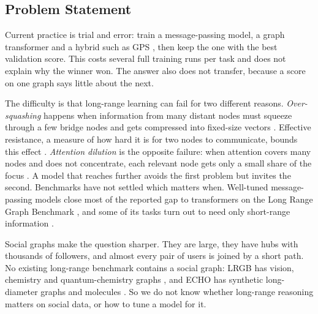 \subsection{Problem Statement}
Current practice is trial and error: train a message-passing model, a graph transformer and a hybrid such as GPS \citep{rampasek2022}, then keep the one with the best validation score. This costs several full training runs per task and does not explain why the winner won. The answer also does not transfer, because a score on one graph says little about the next.

The difficulty is that long-range learning can fail for two different reasons. \emph{Over-squashing} happens when information from many distant nodes must squeeze through a few bridge nodes and gets compressed into fixed-size vectors \citep{alon2021,topping2022}. Effective resistance, a measure of how hard it is for two nodes to communicate, bounds this effect \citep{digiovanni2023,black2023}. \emph{Attention dilution} is the opposite failure: when attention covers many nodes and does not concentrate, each relevant node gets only a small share of the focus \citep{xing2024}. A model that reaches further avoids the first problem but invites the second. Benchmarks have not settled which matters when. Well-tuned message-passing models close most of the reported gap to transformers on the Long Range Graph Benchmark \citep{tonshoff2024}, and some of its tasks turn out to need only short-range information \citep{bamberger2025}.

Social graphs make the question sharper. They are large, they have hubs with thousands of followers, and almost every pair of users is joined by a short path. No existing long-range benchmark contains a social graph: LRGB has vision, chemistry and quantum-chemistry graphs \citep{dwivedi2022}, and ECHO has synthetic long-diameter graphs and molecules \citep{miglior2025}. So we do not know whether long-range reasoning matters on social data, or how to tune a model for it.

